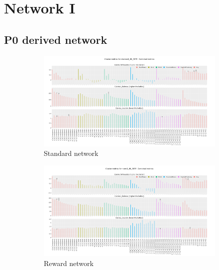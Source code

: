 \section{Network I}

\subsection{P0 derived network} \label{s:ap:P0}

\begin{figure}[!htb]
    \centering
    \begin{subfigure}{0.49\linewidth}
        \includegraphics[width=1.0\textwidth,keepaspectratio]{Sections/Network_I/Resources/P0/CA_metrics_std_tum_4k_v3.png}
        \caption{Standard network}
    \end{subfigure} %
    \centering
    \begin{subfigure}{0.49\linewidth}
        \includegraphics[width=1.0\textwidth,keepaspectratio]{Sections/Network_I/Resources/P0/CA_metrics_rwd_tum_4k_v3.png}
        \caption{Reward network}
    \end{subfigure}
    \centering
    \begin{subfigure}{0.49\linewidth}

\end{subfigure}
\end{figure}
